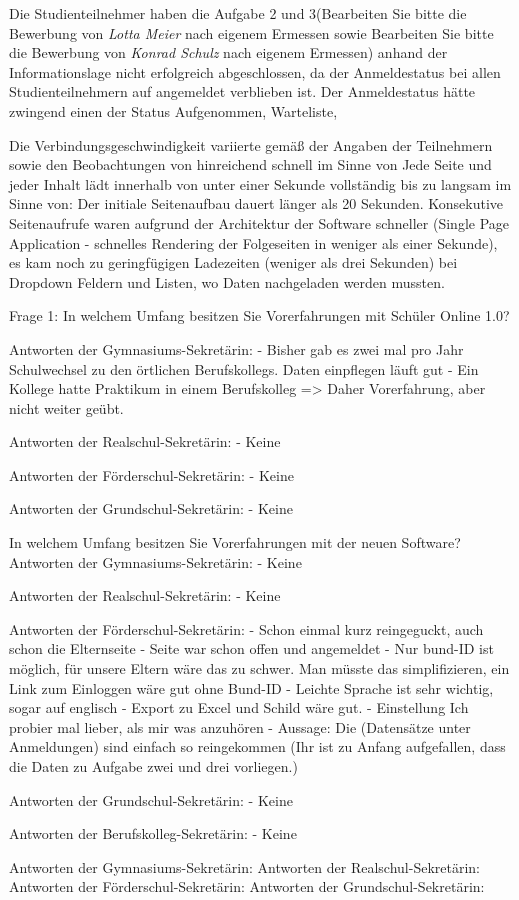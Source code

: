 Die Studienteilnehmer haben die Aufgabe 2 und 3(\glqq Bearbeiten Sie bitte die Bewerbung von \textit{Lotta Meier} nach eigenem Ermessen\grqq{} sowie \glqq Bearbeiten Sie bitte die Bewerbung von \textit{Konrad Schulz} nach eigenem Ermessen\grqq{}) anhand der Informationslage nicht erfolgreich abgeschlossen, da der Anmeldestatus bei allen Studienteilnehmern auf \glqq angemeldet\grqq{} verblieben ist. Der Anmeldestatus hätte zwingend einen der Status \glqq Aufgenommen\grqq{}, \glqq Warteliste\grqq{},\grqq{}\glqq 

Die Verbindungsgeschwindigkeit variierte gemäß der Angaben der Teilnehmern sowie den Beobachtungen von hinreichend schnell im Sinne von \glqq Jede Seite und jeder Inhalt lädt innerhalb von unter einer Sekunde vollständig\grqq{} bis zu langsam im Sinne von: \glqq Der initiale Seitenaufbau dauert länger als 20 Sekunden\grqq{}. Konsekutive Seitenaufrufe waren aufgrund der Architektur der Software schneller (Single Page Application - schnelles Rendering der Folgeseiten in weniger als einer Sekunde), es kam noch zu geringfügigen Ladezeiten (weniger als drei Sekunden) bei Dropdown Feldern und Listen, wo Daten nachgeladen werden mussten.


Frage 1: In welchem Umfang besitzen Sie Vorerfahrungen mit Schüler Online 1.0? 	

Antworten der Gymnasiums-Sekretärin:
- Bisher gab es zwei mal pro Jahr Schulwechsel zu den örtlichen Berufskollegs. Daten einpflegen läuft gut
- Ein Kollege hatte Praktikum in einem Berufskolleg => Daher Vorerfahrung, aber nicht weiter geübt.

Antworten der Realschul-Sekretärin:
- Keine	

Antworten der Förderschul-Sekretärin:
- Keine

Antworten der Grundschul-Sekretärin:
- Keine


In welchem Umfang besitzen Sie Vorerfahrungen mit der neuen Software?		
Antworten der Gymnasiums-Sekretärin:
- Keine				

Antworten der Realschul-Sekretärin:
- Keine				

Antworten der Förderschul-Sekretärin:
- Schon einmal kurz reingeguckt, auch schon die Elternseite
- Seite war schon offen und angemeldet	
- Nur bund-ID ist möglich, für unsere Eltern wäre das zu schwer. Man müsste das simplifizieren, ein Link zum Einloggen wäre gut ohne Bund-ID
- Leichte Sprache ist sehr wichtig, sogar auf englisch
- Export zu Excel und Schild wäre gut.
- Einstellung \glqq Ich probier mal lieber, als mir was anzuhören\grqq{}
- Aussage: \glqq Die (Datensätze unter Anmeldungen) sind einfach so reingekommen\grqq{} (Ihr ist zu Anfang aufgefallen, dass die Daten zu Aufgabe zwei und drei vorliegen.)			

Antworten der Grundschul-Sekretärin:
- Keine		

Antworten der Berufskolleg-Sekretärin:
- Keine				







Antworten der Gymnasiums-Sekretärin:
Antworten der Realschul-Sekretärin:
Antworten der Förderschul-Sekretärin:
Antworten der Grundschul-Sekretärin: